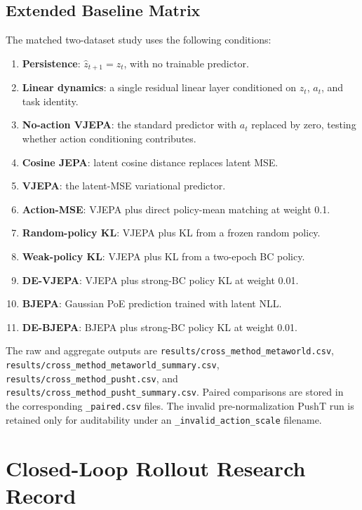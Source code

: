 \documentclass[10pt,twocolumn]{article}
\theoremstyle{tightstyle}
\begin{document}
\subsection{Extended Baseline Matrix}

The matched two-dataset study uses the following conditions:
\begin{enumerate}[leftmargin=1.6em,itemsep=1pt,topsep=3pt]
  \item \textbf{Persistence}: $\hat z_{t+1}=z_t$, with no trainable predictor.
  \item \textbf{Linear dynamics}: a single residual linear layer conditioned on
  $z_t$, $a_t$, and task identity.
  \item \textbf{No-action VJEPA}: the standard predictor with $a_t$ replaced by
  zero, testing whether action conditioning contributes.
  \item \textbf{Cosine JEPA}: latent cosine distance replaces latent MSE.
  \item \textbf{VJEPA}: the latent-MSE variational predictor.
  \item \textbf{Action-MSE}: VJEPA plus direct policy-mean matching at weight 0.1.
  \item \textbf{Random-policy KL}: VJEPA plus KL from a frozen random policy.
  \item \textbf{Weak-policy KL}: VJEPA plus KL from a two-epoch BC policy.
  \item \textbf{DE-VJEPA}: VJEPA plus strong-BC policy KL at weight 0.01.
  \item \textbf{BJEPA}: Gaussian PoE prediction trained with latent NLL.
  \item \textbf{DE-BJEPA}: BJEPA plus strong-BC policy KL at weight 0.01.
\end{enumerate}

The raw and aggregate outputs are
\texttt{results/cross\_method\_metaworld.csv},
\texttt{results/cross\_method\_metaworld\_summary.csv},
\texttt{results/cross\_method\_pusht.csv}, and
\texttt{results/cross\_method\_pusht\_summary.csv}. Paired comparisons are stored
in the corresponding \texttt{\_paired.csv} files. The invalid pre-normalization
PushT run is retained only for auditability under an
\texttt{\_invalid\_action\_scale} filename.

\section{Closed-Loop Rollout Research Record}
\label{app:closed-loop-record}
\end{document}

